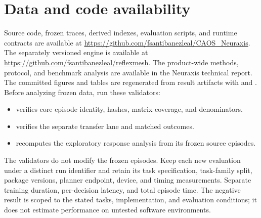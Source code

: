 \documentclass[11pt]{article}
\begin{document}
\section*{Data and code availability}
Source code, frozen traces, derived indexes, evaluation scripts, and runtime contracts are available at \url{https://github.com/fsantibanezleal/CAOS_Neuraxis}. The separately versioned engine is available at \url{https://github.com/fsantibanezleal/reflexmesh}. The product-wide methods, protocol, and benchmark analysis are available in the Neuraxis technical report. The committed figures and tables are regenerated from result artifacts with  and . Before analyzing frozen data, run these validators:
\begin{itemize}
\item {} verifies core episode identity, hashes, matrix coverage, and denominators.
\item {} verifies the separate transfer lane and matched outcomes.
\item {} recomputes the exploratory response analysis from its frozen source episodes.
\end{itemize}
The validators do not modify the frozen episodes. Keep each new evaluation under a distinct run identifier and retain its task specification, task-family split, package versions, planner endpoint, device, and timing measurements. Separate training duration, per-decision latency, and total episode time. The negative result is scoped to the stated tasks, implementation, and evaluation conditions; it does not estimate performance on untested software environments.
\end{document}
